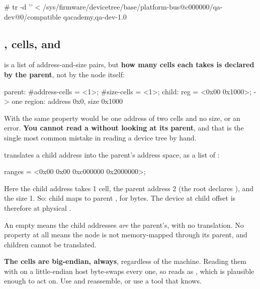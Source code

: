 \begin{console}
# tr -d '\0' < /sys/firmware/devicetree/base/platform-bus@c000000/qa-dev@0/compatible
qacademy,qa-dev-1.0
\end{console}

\subsection{, cells, and }
\label{c10:app:b4}

 is a list of address-and-size pairs, but \textbf{how many cells each takes is declared by
the parent}, not by the node itself:

\begin{console}
parent:  #address-cells = <1>;  #size-cells = <1>;
child:   reg = <0x00 0x1000>;         -> one region: address 0x0, size 0x1000
\end{console}

\noindent With  the same property would be one address of two cells and
no size, or an error. \textbf{You cannot read a  without looking at its parent}, and that
is the single most common mistake in reading a device tree by hand.

 translates a child address into the parent's address space, as a list of
:

\begin{console}
ranges = <0x00 0x00 0xc000000 0x2000000>;
\end{console}

\noindent Here the child address takes 1 cell, the parent address 2 (the root declares
), and the size 1. So: child  maps to parent
, for  bytes. The device at child offset  is therefore
at physical \textbf{}.

An empty  means the child addresses \emph{are} the parent's, with no translation. No
 property at all means the node is not memory-mapped through its parent, and children
cannot be translated.

\textbf{The cells are big-endian, always}, regardless of the machine. Reading them with  on a little-endian host byte-swaps every one, so  reads as ,
which is plausible enough to act on. Use  and reassemble, or use a tool that knows.


